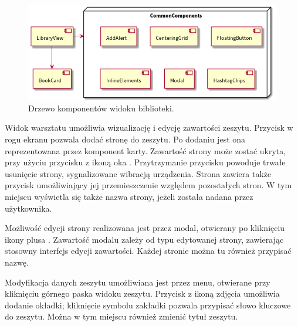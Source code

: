 \begin{figure}[H]
	\begin{center}
		\includegraphics[scale=0.6]{media/LibraryComponents.png}
	\end{center}
	\caption{Drzewo komponentów widoku biblioteki.}
	\label{rys:library-components}
\end{figure}

Widok warsztatu umożliwia wizualizację i edycję zawartości zeszytu. Przycisk w rogu ekranu pozwala dodać stronę do zeszytu.
Po dodaniu jest ona reprezentowana przez komponent karty. Zawartość strony może zostać ukryta,
przy użyciu przycisku z ikoną oka \cite{ionic}. Przytrzymanie przycisku powoduje trwałe usunięcie strony, sygnalizowane wibracją urządzenia.
Strona zawiera także przycisk umożliwiający jej przemieszczenie względem pozostałych stron. W tym miejscu wyświetla się także nazwa
strony, jeżeli została nadana przez użytkownika.

Możliwość edycji strony realizowana jest przez modal, otwierany po kliknięciu ikony plusa \cite{ionic}. Zawartość modalu zależy od
typu edytowanej strony, zawierając stosowny interfejs edycji zawartości. Każdej stronie można tu również przypisać nazwę.

Modyfikacja danych zeszytu umożliwiana jest przez menu, otwierane przy kliknięciu górnego paska widoku zeszytu.
Przycisk z ikoną zdjęcia \cite{ionic} umożliwia dodanie okładki; kliknięcie symbolu zakładki pozwala przypisać słowo kluczowe
do zeszytu. Można w tym miejscu również zmienić tytuł zeszytu.

